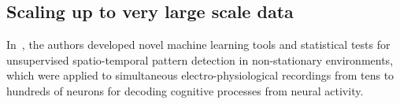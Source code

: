 \documentclass[brainsci, %
               review,submit,pdftex,moreauthors
               ]{Definitions/mdpi}
\begin{document}

\subsection{Scaling up to very large scale data}

In~\citep{russo_cell_2017}, the authors developed novel machine learning tools and statistical tests for unsupervised spatio-temporal pattern detection in non-stationary environments, which were applied to simultaneous electro-physiological recordings from tens to hundreds of neurons for decoding cognitive processes from neural activity.
\end{document}
